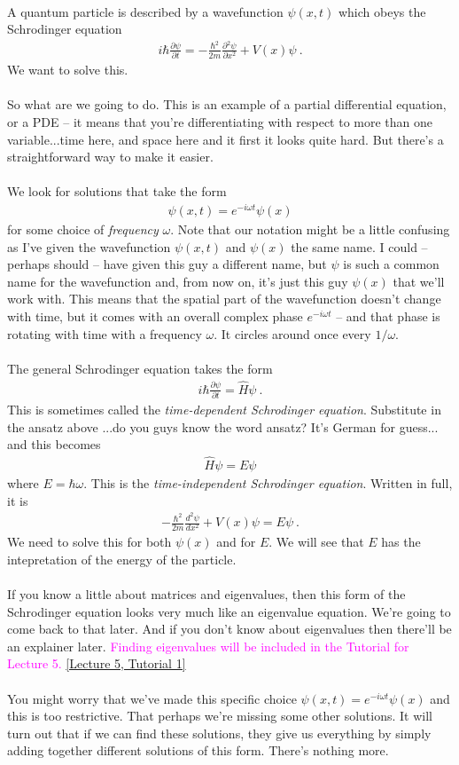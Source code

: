 \documentclass[12pt]{article}
\def\be{\begin{eqnarray}}
\def\ee{\end{eqnarray}}
\newcommand{\nn}{\nonumber}
\newcommand\para{\paragraph{}}
\newcommand{\ppp}[2]{\frac{\partial {#1}}{\partial {#2}}}
\newcommand{\alyssa}{\textcolor{magenta}}
\begin{document}
\para
{\color{olive}A quantum particle is described by a wavefunction $\psi(x,t)$ which obeys the Schrodinger equation
%
\be i\hbar \ppp{\psi}{t} = -\frac{\hbar^2}{2m}\ppp{^2\psi}{x^2} + V(x)\psi\ .\nn\ee
%
We want to solve this.}

\para
So what are we going to do. This is an example of a partial differential equation, or a PDE -- it means that you're differentiating with respect to more than one variable...time here, and space here and it first it looks quite hard. But there's a straightforward way to make it easier.

\para
{\color{olive} We look for solutions that take the form
%
\be \psi(x,t) = e^{-i\omega t} \psi(x)\nn\ee
%
for some choice of {\it frequency} $\omega$.} Note that our notation might be a little confusing as I've given the wavefunction $\psi(x,t)$ and $\psi(x)$ the same name. I could -- perhaps should -- have given this guy a different name, but $\psi$ is such a common name for the wavefunction and, from now on, it's just this guy $\psi(x)$ that we'll work with. This means that the spatial part of the wavefunction doesn't change with time, but it comes with an overall complex phase $e^{-i\omega t}$ -- and that phase is rotating with time with a frequency $\omega$. It circles around once every $1/\omega$.

\para
{\color{olive} The general Schrodinger equation takes the form
%
\be i\hbar \ppp{\psi}{t} = \hat{H}\psi\ .\nn\ee
%
This is sometimes called the {\it time-dependent Schrodinger equation}. Substitute in the ansatz above} ...do you guys know the word ansatz? It's German for guess... {\color{olive} and this becomes
%
\be \hat{H}\psi = E \psi\nn\ee
%
where $E=\hbar\omega$. This is the {\it time-independent Schrodinger equation}. Written in full, it is
%
\be -\frac{\hbar^2}{2m} \frac{d^2\psi}{dx^2} + V(x) \psi = E\psi\ .\nn\ee
%
We need to solve this for both $\psi(x)$ and for $E$. We will see that $E$ has the intepretation of the energy of the particle.}


\para
If you know a little about matrices and eigenvalues, then this form of the Schrodinger equation looks very much like an eigenvalue equation. We're going to come back to that later. And if you don't know about eigenvalues then there'll be an explainer later. \alyssa{Finding eigenvalues will be included in the Tutorial for Lecture 5.} \href{https://drive.google.com/file/d/1TrNUJWBwGnIj0qXJB3SdRJRH1n03Gh1Q/view?usp=drive_link}{[Lecture 5, Tutorial 1]}

\para
You might worry that we've made this specific choice $\psi(x,t) = e^{-i\omega t} \psi(x)$ and this is too restrictive. That perhaps we're missing some other solutions. It will turn out that if we can find these solutions, they give us everything by simply adding together different solutions of this form. There's nothing more. 
\end{document}
